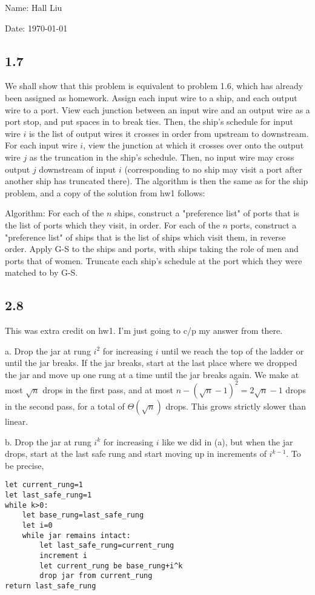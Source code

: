 \documentclass{article}
\begin{document}
Name: Hall Liu

Date: \today 
\vspace{1.5cm}

\subsection*{1.7}
We shall show that this problem is equivalent to problem 1.6, which has already been assigned as homework. Assign each input wire to a ship, and each output wire to a port. View each junction between an input wire and an output wire as a port stop, and put spaces in to break ties. Then, the ship's schedule for input wire $i$ is the list of output wires it crosses in order from upstream to downstream. For each input wire $i$, view the junction at which it crosses over onto the output wire $j$ as the truncation in the ship's schedule. Then, no input wire may cross output $j$ downstream of input $i$ (corresponding to no ship may visit a port after another ship has truncated there). The algorithm is then the same as for the ship problem, and a copy of the solution from hw1 follows:

Algorithm: For each of the $n$ ships, construct a "preference list" of ports that is the list of ports which they visit, in order. For each of the $n$ ports, construct a "preference list" of ships that is the list of ships which visit them, in reverse order. Apply G-S to the ships and ports, with ships taking the role of men and ports that of women. Truncate each ship's schedule at the port which they were matched to by G-S.
\subsection*{2.8}
This was extra credit on hw1. I'm just going to c/p my answer from there. 

a. Drop the jar at rung $i^2$ for increasing $i$ until we reach the top of the ladder or until the jar breaks. If the jar breaks, start at the last place where we dropped the jar and move up one rung at a time until the jar breaks again. We make at most $\sqrt{n}$ drops in the first pass, and at most $n-(\sqrt{n}-1)^2=2\sqrt{n}-1$ drops in the second pass, for a total of $\Theta(\sqrt{n})$ drops. This grows strictly slower than linear.

b. Drop the jar at rung $i^k$ for increasing $i$ like we did in (a), but when the jar drops, start at the last safe rung and start moving up in increments of $i^{k-1}$. To be precise,
\begin{verbatim}
let current_rung=1
let last_safe_rung=1
while k>0:
    let base_rung=last_safe_rung
    let i=0
    while jar remains intact:
        let last_safe_rung=current_rung
        increment i
        let current_rung be base_rung+i^k
        drop jar from current_rung
return last_safe_rung
\end{verbatim}
\end{document}
